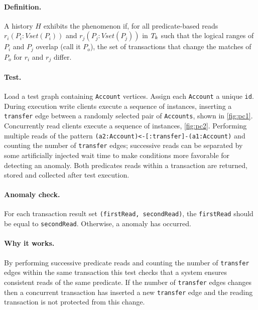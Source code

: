 \paragraph{Definition.}
A history $H$ exhibits the phenomenon  if, for all predicate-based reads $r_i(P_i : \textit{Vset}(P_i))$ and $r_j(P_j : \textit{Vset}(P_j))$ in $T_k$ such that the logical ranges of $P_i$ and $P_j$ overlap (call it $P_o$), the set of transactions that change the matches of $P_o$ for $r_i$ and $r_j$ differ.

\paragraph{Test.}
Load a test graph containing \texttt{Account} vertices. Assign each \texttt{Account}
a unique \texttt{id}. During execution write clients execute a sequence of
 instances, inserting a \texttt{transfer} edge between a
randomly selected pair of \texttt{Accounts}, shown in \autoref{fig:pc1}.
Concurrently read clients execute a sequence of 
instances, \autoref{fig:pc2}. Performing multiple reads of the pattern
\texttt{(a2:Account)<-[:transfer]-(a1:Account)} and counting the number of
\texttt{transfer} edges; successive reads can be separated by some artificially
injected wait time to make conditions more favorable for detecting an anomaly.
Both predicates reads within a  transaction are returned,
stored and collected after test execution.

\paragraph{Anomaly check.}
For each  transaction result set
\texttt{(firstRead, secondRead)}, the \texttt{firstRead} should be equal to
\texttt{secondRead}. Otherwise, a  anomaly has occurred.

\paragraph{Why it works.}
By performing successive predicate reads and counting the number of
\texttt{transfer} edges within the same transaction this test checks that a
system ensures consistent reads of the same predicate. If the number of
\texttt{transfer} edges changes then a concurrent transaction has inserted a new
\texttt{transfer} edge and the reading transaction is not protected from this
change.

